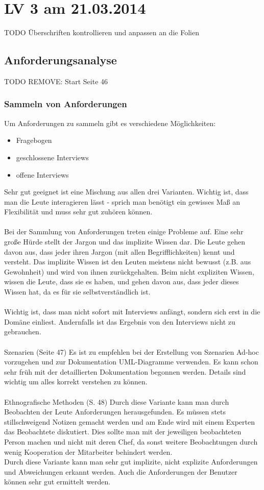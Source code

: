 \chapter{LV 3 am 21.03.2014}
TODO Überschriften kontrollieren und anpassen an die Folien
\section{Anforderungsanalyse}
TODO REMOVE: Start Seite 46
\subsection{Sammeln von Anforderungen}
Um Anforderungen zu sammeln gibt es verschiedene Möglichkeiten:
\begin{itemize}
\item Fragebogen
\item geschlossene Interviews
\item offene Interviews
\end{itemize}

Sehr gut geeignet ist eine Mischung aus allen drei Varianten. Wichtig ist, dass man die Leute interagieren lässt - sprich man benötigt ein gewisses Maß an Flexibilität und muss sehr gut zuhören können.
\\\\
Bei der Sammlung von Anforderungen treten einige Probleme auf. Eine sehr große Hürde stellt der Jargon und das implizite Wissen dar. Die Leute gehen davon aus, dass jeder ihren Jargon (mit allen Begrifflichkeiten) kennt und versteht. Das implizite Wissen ist den Leuten meistens nicht bewusst (z.B. aus Gewohnheit) und wird von ihnen zurückgehalten. Beim nicht expliziten Wissen, wissen die Leute, dass sie es haben, und gehen davon aus, dass jeder dieses Wissen hat, da es für sie selbstverständlich ist. 
\\\\
Wichtig ist, dass man nicht sofort mit Interviews anfängt, sondern sich erst in die Domäne einliest. Andernfalls ist das Ergebnis von den Interviews nicht zu gebrauchen.
\\\\
Szenarien (Seite 47)
Es ist zu empfehlen bei der Erstellung von Szenarien Ad-hoc vorzugehen und zur Dokumentation UML-Diagramme verwenden. Es kann schon sehr früh mit der detaillierten Dokumentation begonnen werden. Details sind wichtig um alles korrekt verstehen zu können.
\\\\
Ethnografische Methoden (S. 48)
Durch diese Variante kann man durch Beobachten der Leute Anforderungen herausgefunden. Es müssen stets stillschweigend Notizen gemacht werden und am Ende wird mit einem Experten das Beobachtete diskutiert. Dies sollte man mit der jeweiligen beobachteten Person machen und nicht mit deren Chef, da sonst weitere Beobachtungen durch wenig Kooperation der Mitarbeiter behindert werden. 
\\
Durch diese Variante kann man sehr gut implizite, nicht explizite Anforderungen und Abweichungen erkannt werden. Auch die Anforderungen der Benutzer können sehr gut ermittelt werden. 
